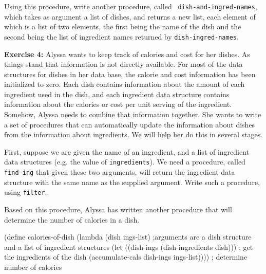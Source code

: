 
Using this procedure,  write another procedure, called {\tt
dish-and-ingred-names}, which takes as argument a list of dishes, and
returns a new list, each element of which is a list of two elements, the
first being the name of the dish and the second being the list of
ingredient names returned by {\tt dish-ingred-names}.


{\bf Exercise 4:}  Alyssa wants to keep track of calories and cost for
her dishes. As things stand that information is not directly
available.  For most of the data structures for dishes in her data
base, the calorie and cost information has been initialized to zero.
Each dish contains information about the amount of each ingredient
used in the dish, and each ingredient data structure contains
information about the calories or cost per unit serving of the
ingredient.  Somehow, Alyssa needs to combine that information together.
She wants to write a set of
procedures that can automatically update the information about dishes
from the information about ingredients.  We will help her do this in
several stages.  

First, suppose we are given the name of an ingredient, and a list of
ingredient data structures (e.g. the value of {\tt ingredients}).  We need a
procedure, called {\tt find-ing}
that given these two arguments, will return the ingredient data
structure with the same name as the supplied argument.  Write such a
procedure, using {\tt filter}.


Based on this procedure, Alyssa has written another procedure that will
determine the number of calories in a dish.

\beginlisp
(define calories-of-dish
  (lambda (dish ings-list)                      
    ;arguments are a dish structure and a list of ingredient structures
    (let ((dish-ings (dish-ingredients dish)))  ; get the ingredients of the dish
      (accumulate-cals dish-ings ings-list))))  ; determine number of calories
\endlisp

